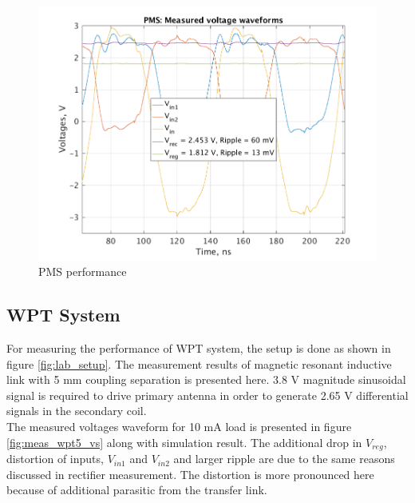 \documentclass[12pt,a4paper,UKenglish]{report}
\begin{document}
\begin{figure} [!htb]
  \centering
  \includegraphics[width=\textwidth]{img/meas/pms_test.pdf} 
 \caption{PMS performance} 
\label{fig:meas_pms} 
\end{figure}

\subsection{WPT System} %
For measuring the performance of WPT system, the setup is done as shown in figure \ref{fig:lab_setup}. The measurement results of magnetic resonant inductive link with 5 mm 
coupling separation is presented here. 3.8 V magnitude sinusoidal  signal is required to drive primary antenna in order to generate 2.65 V differential signals in the secondary coil.\\

The measured voltages waveform for 10 mA load is presented in figure  \ref{fig:meas_wpt5_vs} along with simulation result.  The additional drop in $V_{reg}$, distortion of inputs, $V_{in1}$ and $V_{in2}$ and larger ripple are due to the same reasons discussed in  rectifier measurement. The distortion is more pronounced here because of additional parasitic from the transfer link. \\
\end{document}
